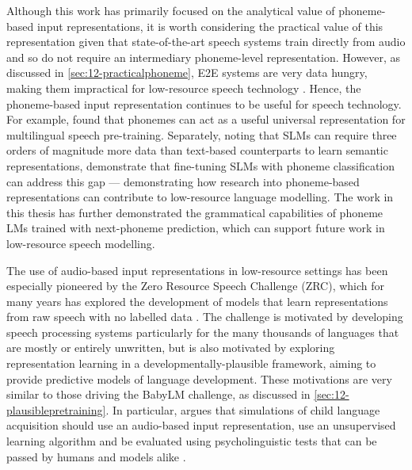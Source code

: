 Although this work has primarily focused on the analytical value of phoneme-based input representations, it is worth considering the practical value of this representation given that state-of-the-art speech systems train directly from audio and so do not require an intermediary phoneme-level representation. However, as discussed in \cref{sec:12-practicalphoneme}, E2E systems are very data hungry, making them impractical for low-resource speech technology \citet{li2022recent}. Hence, the phoneme-based input representation continues to be useful for speech technology. For example, \citet{feng-2023-language-universal-phonetic} found that phonemes can act as a useful universal representation for multilingual speech pre-training. Separately, noting that SLMs can require three orders of magnitude more data than text-based counterparts to learn semantic representations, \citet{poli2024improving} demonstrate that fine-tuning SLMs with phoneme classification can address this gap --- demonstrating how research into phoneme-based representations can contribute to low-resource language modelling. The work in this thesis has further demonstrated the grammatical capabilities of phoneme LMs trained with next-phoneme prediction, which can support future work in low-resource speech modelling.


The use of audio-based input representations in low-resource settings has been especially pioneered by the Zero Resource Speech Challenge (ZRC), which for many years has explored the development of models that learn representations from raw speech with no labelled data \citep[see][for an overview]{dunbar2022self}. The challenge is motivated by developing speech processing systems particularly for the many thousands of languages that are mostly or entirely unwritten, but is also motivated by exploring representation learning in a developmentally-plausible framework, aiming to provide predictive models of language development. These motivations are very similar to those driving the BabyLM challenge, as discussed in \cref{sec:12-plausiblepretraining}. In particular, \citet{dupoux-2018-cognitive} argues that simulations of child language acquisition should use an audio-based input representation, use an unsupervised learning algorithm and be evaluated using psycholinguistic tests that can be passed by humans and models alike \citet{dupoux-2018-cognitive}.

